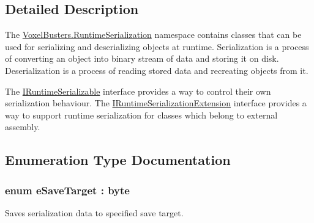 \subsection{Detailed Description}
The \hyperlink{namespace_voxel_busters_1_1_runtime_serialization}{Voxel\+Busters.\+Runtime\+Serialization} namespace contains classes that can be used for serializing and deserializing objects at runtime. Serialization is a process of converting an object into binary stream of data and storing it on disk. Deserialization is a process of reading stored data and recreating objects from it. 

The \hyperlink{interface_voxel_busters_1_1_runtime_serialization_1_1_i_runtime_serializable}{I\+Runtime\+Serializable} interface provides a way to control their own serialization behaviour. The \hyperlink{interface_voxel_busters_1_1_runtime_serialization_1_1_i_runtime_serialization_extension}{I\+Runtime\+Serialization\+Extension} interface provides a way to support runtime serialization for classes which belong to external assembly. 

\subsection{Enumeration Type Documentation}
\hypertarget{namespace_voxel_busters_1_1_runtime_serialization_aacaa3008b2cb441fbe4708df854019bf}{}
\subsubsection[{e\+Save\+Target}]{\setlength{\rightskip}{0pt plus 5cm}enum {\bf e\+Save\+Target} \+: byte}\label{namespace_voxel_busters_1_1_runtime_serialization_aacaa3008b2cb441fbe4708df854019bf}


Saves serialization data to specified save target. 


